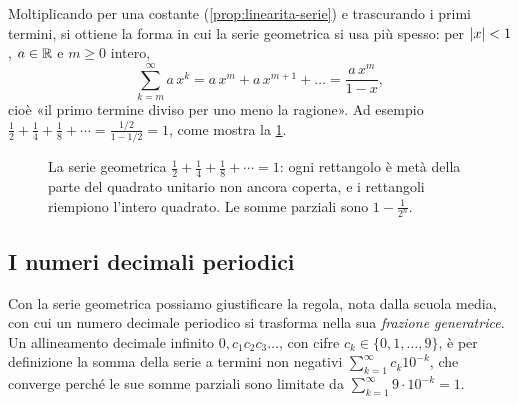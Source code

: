 Moltiplicando per una costante (\cref{prop:linearita-serie}) e trascurando i primi
termini, si ottiene la forma in cui la serie geometrica si usa più spesso: per $\lvert x\rvert<1$,
$a\in\mathbb{R}$ e $m\ge0$ intero,
\begin{equation}\label{eq:geometrica-generale}
  \sum_{k=m}^{\infty}a\,x^{k}=a\,x^{m}+a\,x^{m+1}+\dots=\frac{a\,x^{m}}{1-x} ,
\end{equation}
cioè «il primo termine diviso per uno meno la ragione». Ad esempio
$\frac12+\frac14+\frac18+\cdots=\frac{1/2}{1-1/2}=1$, come mostra la \cref{fig:quadrato-geometrico}.

\begin{figure}[htb]
\centering
{}
\caption{La serie geometrica $\frac12+\frac14+\frac18+\cdots=1$: ogni rettangolo è metà della
parte del quadrato unitario non ancora coperta, e i rettangoli riempiono l'intero
quadrato. Le somme parziali sono $1-\frac1{2^{n}}$.}
\label{fig:quadrato-geometrico}
\end{figure}

\subsection{I numeri decimali periodici}

Con la serie geometrica possiamo giustificare la regola, nota dalla scuola media, con
cui un numero decimale periodico si trasforma nella sua \emph{frazione generatrice}. Un
allineamento decimale infinito $0{,}c_{1}c_{2}c_{3}\ldots$, con cifre $c_{k}\in\{0,1,\dots,9\}$, è per
definizione la somma della serie a termini non negativi $\sum_{k=1}^{\infty}c_{k}10^{-k}$, che
converge perché le sue somme parziali sono limitate da $\sum_{k=1}^{\infty}9\cdot10^{-k}=1$.

